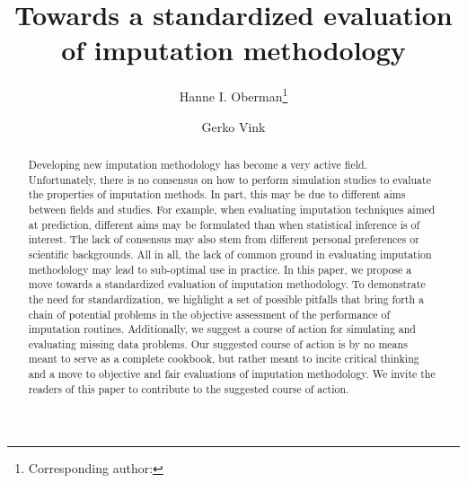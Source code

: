 \documentclass[bimj,fleqn]{w-art}
\begin{document}
\keywords{Evaluation; Imputation; Missing data; Simulation studies;\\ [1pc]
\noindent \hspace*{-4pc} Supporting information and a simulation archive are available from \underline{www.gerkovink.com/evaluation}.\\
}  %

\title[Towards a standardized evaluation of imputation methodology]{Towards a standardized evaluation of imputation methodology}
\author[Oberman]{Hanne I. Oberman\footnote{Corresponding author: {}}} 
\address[\inst{1}]{Departement of Methodology \& Statistics, Padualaan 14, 3584 CH Utrecht, The Netherlands}
\author[Vink]{Gerko Vink}
   

\begin{abstract}
Developing new imputation methodology has become a very active field. Unfortunately, there is no consensus on how to perform simulation studies to evaluate the properties of imputation methods. In part, this may be due to different aims between fields and studies. For example, when evaluating imputation techniques aimed at prediction, different aims may be formulated than when statistical inference is of interest. The lack of consensus may also stem from different personal preferences or scientific backgrounds. All in all, the lack of common ground in evaluating imputation methodology may lead to sub-optimal use in practice. In this paper, we propose a move towards a standardized evaluation of imputation methodology. To demonstrate the need for standardization, we highlight a set of possible pitfalls that bring forth a chain of potential problems in the objective assessment of the performance of imputation routines.  Additionally, we suggest a course of action for simulating and evaluating missing data problems. Our suggested course of action is by no means meant to serve as a complete cookbook, but rather meant to incite critical thinking and a move to objective and fair evaluations of imputation methodology. We invite the readers of this paper to contribute to the suggested course of action.
\end{abstract}
\end{document}
